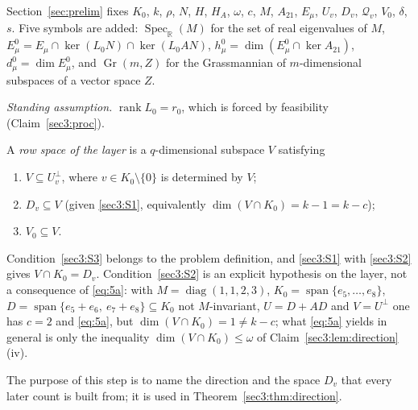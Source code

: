\documentclass[journal]{IEEEtran}
\theoremstyle{plainn}
\theoremstyle{remark}
\newcommand{\rank}{\operatorname{rank}}
\newcommand{\Gr}{\operatorname{Gr}}
\begin{document}
Section~\ref{sec:prelim} fixes $K_0$, $k$, $\rho$, $N$, $H$, $H_A$, $\omega$, $c$, $M$, $A_{21}$,
$E_\mu$, $U_v$, $D_v$, $\mathcal Q_v$, $V_0$, $\delta$, $s$. Five symbols are added:
$\operatorname{Spec}_{\mathbb R}(M)$ for the set of real eigenvalues of $M$,
$E_\mu^0=E_\mu\cap\ker(L_0N)\cap\ker(L_0AN)$,
$h_\mu^0=\dim(E_\mu^0\cap\ker A_{21})$, $d_\mu^0=\dim E_\mu^0$, and $\Gr(m,Z)$ for the Grassmannian of
$m$-dimensional subspaces of a vector space $Z$.

\noindent\emph{Standing assumption.} $\rank L_0=r_0$, which is forced by feasibility
(Claim~\ref{sec3:proc}).

A \emph{row space of the layer} is a $q$-dimensional subspace $V$ satisfying
\begin{enumerate}[label=(S\arabic*),ref={(S\arabic*)},leftmargin=2.6em,itemsep=1pt,topsep=2pt]
\item\label{sec3:S1} $V\subseteq U_v^\perp$, where $v\in K_0\setminus\{0\}$ is determined by $V$;
\item\label{sec3:S2} $D_v\subseteq V$ (given \ref{sec3:S1}, equivalently $\dim(V\cap K_0)=k-1=k-c$);
\item\label{sec3:S3} $V_0\subseteq V$.
\end{enumerate}
Condition~\ref{sec3:S3} belongs to the problem definition, and \ref{sec3:S1} with \ref{sec3:S2} gives
$V\cap K_0=D_v$. Condition~\ref{sec3:S2} is an explicit hypothesis on the layer, not a consequence of
\eqref{eq:5a}: with $M=\operatorname{diag}(1,1,2,3)$, $K_0=\operatorname{span}\{e_5,\dots,e_8\}$,
$D=\operatorname{span}\{e_5+e_6,\ e_7+e_8\}\subseteq K_0$ not $M$-invariant, $U=D+AD$ and $V=U^\perp$ one
has $c=2$ and \eqref{eq:5a}, but $\dim(V\cap K_0)=1\ne k-c$; what \eqref{eq:5a} yields in general is only
the inequality $\dim(V\cap K_0)\le\omega$ of Claim~\ref{sec3:lem:direction}(iv).


The purpose of this step is to name the direction and the space $D_v$ that every later count is built
from; it is used in Theorem~\ref{sec3:thm:direction}.
\end{document}
